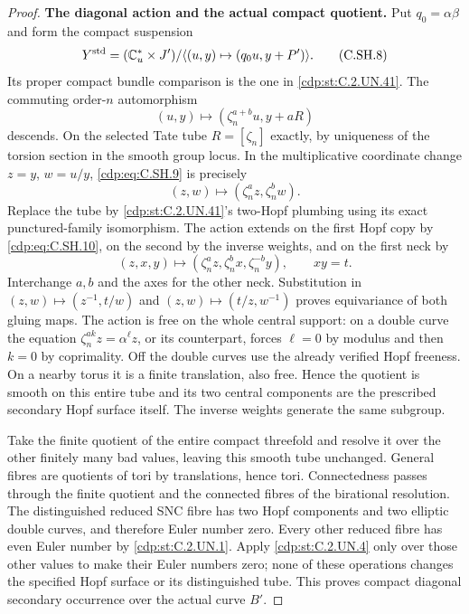 \begin{proof}
\par\medskip\noindent\textbf{The diagonal action and the actual compact quotient.}
Put $q_0=\alpha\beta$ and form the compact suspension
\[
 Y^{\rm std}=(\mathbb C^*_u\times J')/
       \langle(u,y)\mapsto(q_0u,y+P')\rangle.
\tag{C.SH.8}\label{cdp:eq:C.SH.8}
\]
Its proper compact bundle comparison is the one in
\ref{cdp:st:C.2.UN.41}. The commuting order-$n$ automorphism
\[
               (u,y)\longmapsto
                  (\zeta_n^{a+b}u,y+aR)
\tag{C.SH.9}\label{cdp:eq:C.SH.9}
\]
descends. On the selected Tate tube $R=[\zeta_n]$ exactly,
by uniqueness of the torsion section in the smooth group
locus. In the multiplicative coordinate change $z=y$, $w=u/y$,
\eqref{cdp:eq:C.SH.9} is precisely
\[
                    (z,w)\longmapsto
                    (\zeta_n^a z,\zeta_n^b w).
\tag{C.SH.10}\label{cdp:eq:C.SH.10}
\]
Replace the tube by \ref{cdp:st:C.2.UN.41}'s two-Hopf plumbing using
its exact punctured-family isomorphism. The action extends
on the first Hopf copy by \eqref{cdp:eq:C.SH.10}, on the second by the
inverse weights, and on the first neck by
\[
 (z,x,y)\longmapsto
     (\zeta_n^a z,\zeta_n^b x,\zeta_n^{-b}y),
                         \qquad xy=t.
\tag{C.SH.11}\label{cdp:eq:C.SH.11}
\]
Interchange $a,b$ and the axes for the other neck.
Substitution in $(z,w)\mapsto(z^{-1},t/w)$ and
$(z,w)\mapsto(t/z,w^{-1})$ proves equivariance of both
gluing maps. The action is free on the whole central
support: on a double curve the equation
$\zeta_n^{ak}z=\alpha^\ell z$, or its counterpart, forces
$\ell=0$ by modulus and then $k=0$ by coprimality.
Off the double curves use the already verified Hopf
freeness. On a nearby torus it is a finite translation,
also free. Hence the quotient is smooth on this entire
tube and its two central components are the prescribed
secondary Hopf surface itself. The inverse weights
generate the same subgroup.

Take the finite quotient of the entire compact threefold
and resolve it over the other finitely many bad values,
leaving this smooth tube unchanged. General fibres are
quotients of tori by translations, hence tori. Connectedness
passes through the finite quotient and the connected fibres
of the birational resolution. The distinguished reduced
SNC fibre has two Hopf components and two elliptic double
curves, and therefore Euler number zero. Every other
reduced fibre has even Euler number by \ref{cdp:st:C.2.UN.1}.
Apply \ref{cdp:st:C.2.UN.4} only over those other values to make their
Euler numbers zero; none of these operations changes
the specified Hopf surface or its distinguished tube.
This proves compact diagonal secondary occurrence over
the actual curve $B'$.


\end{proof}
